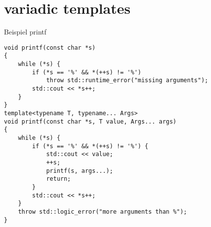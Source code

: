 \section{variadic templates}

\begin{frame}[fragile]{Beispiel printf}
	\begin{lstlisting}[basicstyle=\tiny]
void printf(const char *s)
{
    while (*s) {
        if (*s == '%' && *(++s) != '%')
            throw std::runtime_error("missing arguments");
        std::cout << *s++;
    }
}
template<typename T, typename... Args>
void printf(const char *s, T value, Args... args)
{
    while (*s) {
        if (*s == '%' && *(++s) != '%') {
            std::cout << value;
            ++s;
            printf(s, args...);
            return;
        }
        std::cout << *s++;
    }
    throw std::logic_error("more arguments than %");
}
\end{lstlisting}
\end{frame}
